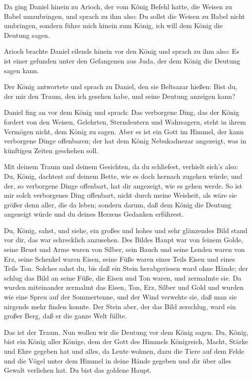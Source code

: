  Da ging Daniel hinein zu Arioch, der vom König Befehl
hatte, die Weisen zu Babel umzubringen, und sprach zu ihm also: Du
sollst die Weisen zu Babel nicht umbringen, sondern führe mich hinein
zum König, ich will dem König die Deutung sagen.

 Arioch brachte Daniel eilends hinein vor den König und
sprach zu ihm also: Es ist einer gefunden unter den Gefangenen aus Juda,
der dem König die Deutung sagen kann.

 Der König antwortete und sprach zu Daniel, den sie
Beltsazar hießen: Bist du, der mir den Traum, den ich gesehen habe, und
seine Deutung anzeigen kann?

 Daniel fing an vor dem König und sprach: Das verborgene
Ding, das der König fordert von den Weisen, Gelehrten, Sterndeutern und
Wahrsagern, steht in ihrem Vermögen nicht, dem König zu sagen.
 Aber es ist ein Gott im Himmel, der kann verborgene Dinge
offenbaren; der hat dem König Nebukadnezar angezeigt, was in künftigen
Zeiten geschehen soll.

 Mit deinem Traum und deinem Gesichten, da du schliefest,
verhielt sich's also: Du, König, dachtest auf deinem Bette, wie es doch
hernach zugehen würde; und der, so verborgene Dinge offenbart, hat dir
angezeigt, wie es gehen werde.  So ist mir solch
verborgenes Ding offenbart, nicht durch meine Weisheit, als wäre sie
größer denn aller, die da leben; sondern darum, daß dem König die
Deutung angezeigt würde und du deines Herzens Gedanken erführest.

 Du, König, sahst, und siehe, ein großes und hohes und sehr
glänzendes Bild stand vor dir, das war schrecklich anzusehen.
 Des Bildes Haupt war von feinem Golde, seine Brust und
Arme waren von Silber, sein Bauch und seine Lenden waren von Erz,
 seine Schenkel waren Eisen, seine Füße waren eines Teils
Eisen und eines Teils Ton.  Solches sahst du, bis daß ein
Stein herabgerissen ward ohne Hände; der schlug das Bild an seine Füße,
die Eisen und Ton waren, und zermalmte sie.  Da wurden
miteinander zermalmt das Eisen, Ton, Erz, Silber und Gold und wurden wie
eine Spreu auf der Sommertenne, und der Wind verwehte sie, daß man sie
nirgends mehr finden konnte. Der Stein aber, der das Bild zerschlug,
ward ein großer Berg, daß er die ganze Welt füllte.

 Das ist der Traum. Nun wollen wir die Deutung vor dem
König sagen.  Du, König, bist ein König aller Könige, dem
der Gott des Himmels Königreich, Macht, Stärke und Ehre gegeben hat
 und alles, da Leute wohnen, dazu die Tiere auf dem Felde
und die Vögel unter dem Himmel in deine Hände gegeben und dir über alles
Gewalt verliehen hat. Du bist das goldene Haupt.

